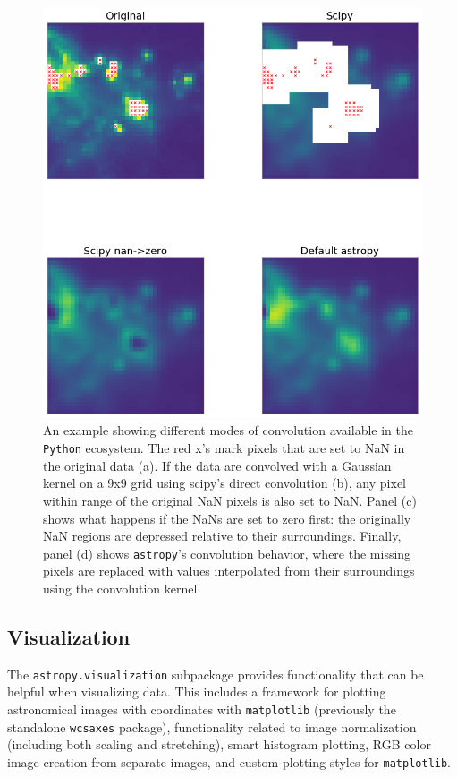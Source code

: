\documentclass[modern]{aastex61}
\newcommand{\package}[1]{\texttt{#1}\xspace}
\newcommand{\python}{\package{Python}}
\newcommand{\astropypkg}{\package{astropy}}
\begin{document}
\begin{figure}
\includegraphics[width=\textwidth]{convolution_example.png}
\caption{%
    An example showing different modes of convolution available in the \python
    ecosystem.  The red x's mark pixels that are set to NaN in the original data
    (a).  If the data are convolved with a Gaussian kernel on a 9x9 grid using
    scipy's direct convolution (b), any pixel within range of the original NaN
    pixels is also set to NaN.  Panel (c) shows what happens if the NaNs are set
    to zero first: the originally NaN regions are depressed relative to their
    surroundings.  Finally, panel (d) shows \astropypkg's convolution behavior,
    where the missing pixels are replaced with values interpolated from their
    surroundings using the convolution kernel.
    \label{fig:convolution-example}
}
\end{figure}


\subsection{Visualization}

The \package{astropy.visualization} subpackage provides functionality that can be helpful when visualizing data. This includes a framework for plotting astronomical images with coordinates with \package{matplotlib} (previously the standalone \package{wcsaxes} package), functionality related to image normalization (including both scaling and stretching), smart histogram plotting, RGB color image creation from separate images, and custom plotting styles for \package{matplotlib}.
\end{document}
